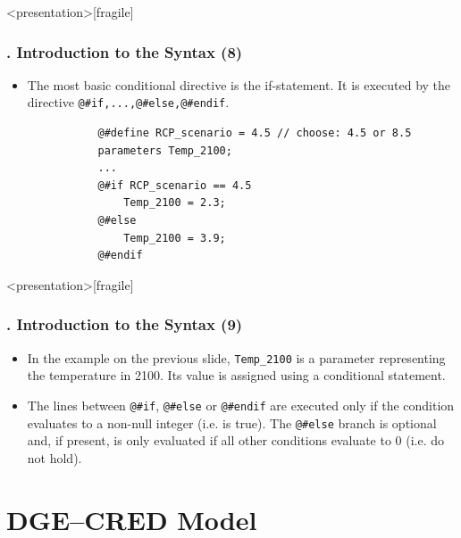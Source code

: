 \documentclass[11pt,aspectratio=169]{beamer}
\begin{document}
\begin{frame}<presentation>[fragile]
	\frametitle{{\thesection.\thesubsection\thinspace\thesubsubsection} Introduction to the Syntax (8)}
	\begin{itemize}
		\item The most basic conditional directive is the if-statement. It is executed by the directive \texttt{@\#if,...,@\#else,@\#endif}.
		\begin{verbatim}
		   @#define RCP_scenario = 4.5 // choose: 4.5 or 8.5
		   parameters Temp_2100;
		   ...
		   @#if RCP_scenario == 4.5
		   	   Temp_2100 = 2.3;
		   @#else
		   	   Temp_2100 = 3.9;
		   @#endif
		\end{verbatim}
	\end{itemize}
\end{frame}
\begin{frame}<presentation>[fragile]
	\frametitle{{\thesection.\thesubsection\thinspace\thesubsubsection} Introduction to the Syntax (9)}
	\begin{itemize}
		\item In the example on the previous slide, \texttt{Temp\_2100} is a parameter representing the temperature in 2100. Its value is assigned using a conditional statement. 
		\item The lines between \texttt{@\#if}, \texttt{@\#else} or \texttt{@\#endif} are executed only if the condition evaluates to a non-null integer (i.e. is true). The \texttt{@\#else} branch is optional and, if present, is only evaluated if all other conditions evaluate to 0 (i.e. do not hold). 
	\end{itemize}
\end{frame}

\section{DGE--CRED Model}
\end{document}
